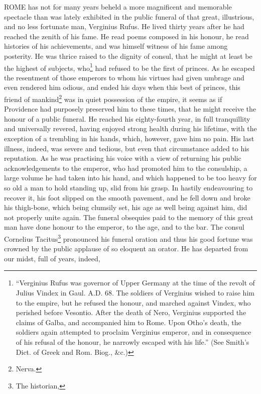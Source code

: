 ROME has not for many years beheld a more magnificent and memorable
spectacle than was lately exhibited in the public funeral of that great,
illustrious, and no less fortunate man, Verginius Rufus. He lived thirty
years after he had reached the zenith of his fame. He read poems composed
in his honour, he read histories of his achievements, and was himself
witness of his fame among posterity. He was thrice raised to the dignity
of consul, that he might at least be the highest of subjects, who\footnote{``Verginius Rufus was
governor of Upper Germany at the time of the revolt of Julius Vindex in
Gaul. A.D. 68. The soldiers of Verginius wished to raise him to the
empire, but he refused the honour, and marched against Vindex, who
perished before Vesontio. After the death of Nero, Verginius supported the
claims of Galba, and accompanied him to Rome. Upon Otho's death, the
soldiers again attempted to proclaim Verginius emperor, and in consequence
of his refusal of the honour, he narrowly escaped with his life.'' (See
Smith's Dict. of Greek and Rom. Biog., \&c.)} had
refused to be the first of princes. As he escaped the resentment of those
emperors to whom his virtues had given umbrage and even rendered him
odious, and ended his days when this best of princes, this friend of
mankind\footnote{Nerva.}
was in quiet possession of the empire, it seems as if Providence had
purposely preserved him to these times, that he might receive the honour
of a public funeral. He reached his eighty-fourth year, in full
tranquillity and universally revered, having enjoyed strong health during
his lifetime, with the exception of a trembling in his hands, which,
however, gave him no pain. His last illness, indeed, was severe and
tedious, but even that circumstance added to his reputation. As he was
practising his voice with a view of returning his public acknowledgements
to the emperor, who had promoted him to the consulship, a large volume he
had taken into his hand, and which happened to be too heavy for so old a
man to hold standing up, slid from his grasp. In hastily endeavouring to
recover it, his foot slipped on the smooth pavement, and he fell down and
broke his thigh-bone, which being clumsily set, his age as well being
against him, did not properly unite again. The funeral obsequies paid to
the memory of this great man have done honour to the emperor, to the age,
and to the bar. The consul Cornelius Tacitus\footnote{The historian,} pronounced his funeral
oration and thus his good fortune was crowned by the public applause of so
eloquent an orator. He has departed from our midst, full of years, indeed,

